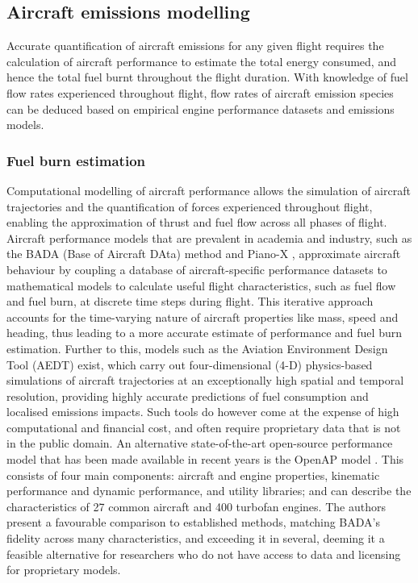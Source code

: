 

\subsection{Aircraft emissions modelling}
Accurate quantification of aircraft emissions for any given flight requires the calculation of aircraft performance to estimate the total energy consumed, and hence the total fuel burnt throughout the flight duration. With knowledge of fuel flow rates experienced throughout flight, flow rates of aircraft emission species can be deduced based on empirical engine performance datasets and emissions models.

\subsubsection{Fuel burn estimation}
Computational modelling of aircraft performance allows the simulation of aircraft trajectories and the quantification of forces experienced throughout flight, enabling the approximation of thrust and fuel flow across all phases of flight. Aircraft performance models that are prevalent in academia and industry, such as the BADA (Base of Aircraft DAta) method \cite{Nuic2010} and Piano-X \cite{PIANO_X}, approximate aircraft behaviour by coupling a database of aircraft-specific performance datasets to mathematical models to calculate useful flight characteristics, such as fuel flow and fuel burn, at discrete time steps during flight. This iterative approach accounts for the time-varying nature of aircraft properties like mass, speed and heading, thus leading to a more accurate estimate of performance and fuel burn estimation. Further to this, models such as the Aviation Environment Design Tool (AEDT) \cite{AEDT} exist, which carry out four-dimensional (4-D) physics-based simulations of aircraft trajectories at an exceptionally high spatial and temporal resolution, providing highly accurate predictions of fuel consumption and localised emissions impacts. Such tools do however come at the expense of high computational and financial cost, and often require proprietary data that is not in the public domain. An alternative state-of-the-art open-source performance model that has been made available in recent years is the OpenAP model \cite{Sun2020}. This consists of four main components: aircraft and engine properties, kinematic performance and dynamic performance, and utility libraries; and can describe the characteristics of 27 common aircraft and 400 turbofan engines. The authors present a favourable comparison to established methods, matching BADA's fidelity across many characteristics, and exceeding it in several, deeming it a feasible alternative for researchers who do not have access to data and licensing for proprietary models. 

